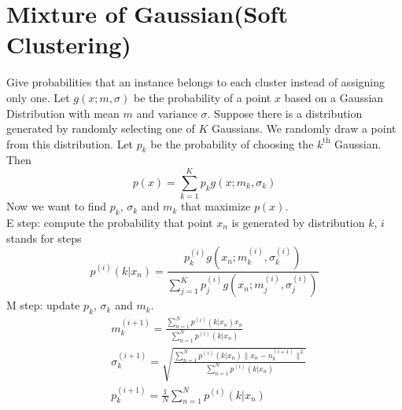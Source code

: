 \documentclass[../main.tex]{subfiles}
\begin{document}
    \section{Mixture of Gaussian(Soft Clustering)}
        Give probabilities that an instance belongs to each cluster instead of assigning only one. Let $g(x;m,\sigma)$ be the probability of a point $x$ based on a Gaussian Distribution with mean $m$ and variance $\sigma$. Suppose there is a distribution generated by randomly selecting one of $K$ Gaussians. We randomly draw a point from this distribution. Let $p_k$ be the probability of choosing the $k^\mathrm{th}$ Gaussian. Then
        \[
            p(x)=\sum_{k=1}^Kp_kg(x;m_k,\sigma_k)
        \]
        Now we want to find $p_k$, $\sigma_k$ and $m_k$ that maximize $p(x)$.\\
        E step: compute the probability that point $x_n$ is generated by distribution $k$, $i$ stands for steps
        \[
            p^{(i)}(k|x_n)=\frac{p^{(i)}_kg(x_n;m^{(i)}_k,\sigma^{(i)}_k)}{\sum_{j=1}^Kp^{(i)}_jg(x_n;m^{(i)}_j,\sigma^{(i)}_j)}
        \]
        M step: update $p_k$, $\sigma_k$ and $m_k$.
        \begin{align*}
            &m_k^{(i+1)} = \frac{\sum_{n=1}^Np^{(i)}(k|x_n)x_n}{\sum_{n=1}^Np^{(i)}(k|x_n)}\\
            &\sigma^{(i+1)}_k = \sqrt{\frac{\sum_{n=1}^Np^{(i)}(k|x_n)\|x_n-n^{(i+1)}_k\|^2}{\sum_{n=1}^Np^{(i)}(k|x_n)}}\\
            &p^{(i+1)}_k=\frac{1}{N}\sum_{n=1}^Np^{(i)}(k|x_n)
        \end{align*}
\end{document}
